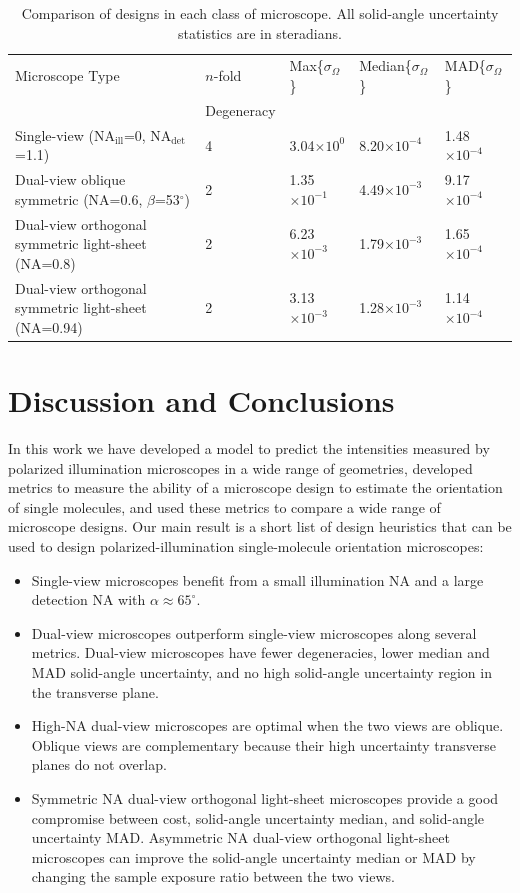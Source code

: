 \documentclass[10pt]{article}
\begin{document}
\begin{table}[ht!]
\centering
\caption{Comparison of designs in each class of microscope. All solid-angle
  uncertainty statistics are in steradians.}
\begin{tabular}{lllll}
  \toprule

  Microscope Type&$n$-fold&Max\{$\sigma_{\Omega}$\}&Median\{$\sigma_{\Omega}$\}&MAD\{$\sigma_{\Omega}$\}\\ 
    &Degeneracy&&&\\\midrule
Single-view (NA${}_\textrm{ill}$=0, NA${}_\textrm{det}$=1.1)&4&3.04$\times 10^{0}$&8.20$\times 10^{-4}$&1.48$\times 10^{-4}$ \\ 
  Dual-view oblique symmetric (NA=0.6, $\beta$=53${}^{\circ}$)&2&1.35$\times 10^{-1}$&4.49$\times 10^{-3}$&9.17$\times 10^{-4}$\\
Dual-view orthogonal symmetric light-sheet (NA=0.8)&2&6.23$\times 10^{-3}$&1.79$\times 10^{-3}$&1.65$\times 10^{-4}$\\  
Dual-view orthogonal symmetric light-sheet (NA=0.94)&2&3.13$\times 10^{-3}$&1.28$\times 10^{-3}$&1.14$\times 10^{-4}$\\
\bottomrule
\end{tabular}
\end{table}

\section{Discussion and Conclusions}\label{discussion}
In this work we have developed a model to predict the intensities measured by
polarized illumination microscopes in a wide range of geometries, developed
metrics to measure the ability of a microscope design to estimate the
orientation of single molecules, and used these metrics to compare a wide
range of microscope designs. Our main result is a short list of design
heuristics that can be used to design polarized-illumination single-molecule
orientation microscopes:
\begin{itemize}
\item Single-view microscopes benefit from a small illumination NA and a large
  detection NA with $\alpha \approx 65^{\circ}$.
\item Dual-view microscopes outperform single-view microscopes along several
  metrics. Dual-view microscopes have fewer degeneracies, lower median and MAD
  solid-angle uncertainty, and no high solid-angle uncertainty region in the
  transverse plane.
\item High-NA dual-view microscopes are optimal when the two views are
  oblique. Oblique views are complementary because their high uncertainty
  transverse planes do not overlap.
\item Symmetric NA dual-view orthogonal light-sheet microscopes provide a good
  compromise between cost, solid-angle uncertainty median, and solid-angle
  uncertainty MAD. Asymmetric NA dual-view orthogonal light-sheet microscopes
  can improve the solid-angle uncertainty median or MAD by changing the sample
  exposure ratio between the two views.
\end{itemize}
\end{document}
